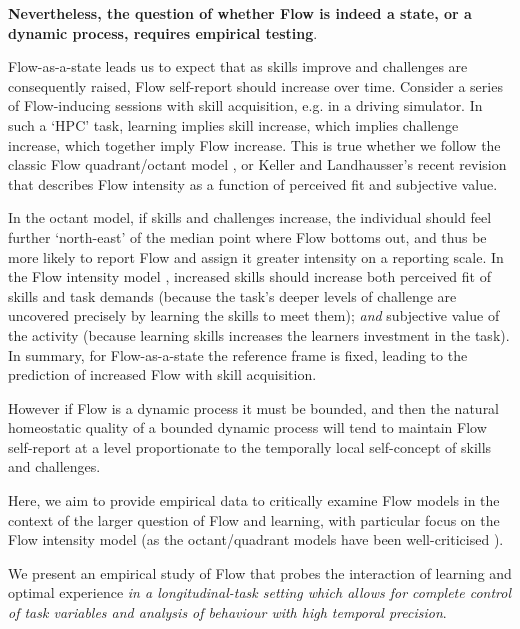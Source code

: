 \documentclass[fleqn,10pt]{wlscirep}
\begin{document}
{\bf Nevertheless, the question of whether Flow is indeed a state, or a dynamic process, requires empirical testing}.

Flow-as-a-state leads us to expect that as skills improve and challenges are consequently raised, Flow self-report should increase over time. Consider a series of Flow-inducing sessions with  skill acquisition, e.g. in a driving simulator. In such a `HPC' task, learning implies skill increase, which implies challenge increase, which together imply Flow increase. This is true whether we follow the classic Flow quadrant/octant model \cite{Massimini1988}, or Keller and Landhausser's \cite[pp-56]{Keller2012} recent revision that describes Flow intensity as a function of perceived fit and subjective value.

In the octant model, if skills and challenges increase, the individual should feel further `north-east' of the median point where Flow bottoms out, and thus be more likely to report Flow and assign it greater intensity on a reporting scale. In the Flow intensity model \cite{Keller2012}, increased skills should increase both perceived fit of skills and task demands (because the task's deeper levels of challenge are uncovered precisely by learning the skills to meet them); {\it and} subjective value of the activity (because learning skills increases the learners investment in the task). In summary, for Flow-as-a-state the reference frame is fixed, leading to the prediction of increased Flow with skill acquisition.

However if Flow is a dynamic process it must be bounded, and then the natural homeostatic quality of a bounded dynamic process will tend to maintain Flow self-report at a level proportionate to the temporally local self-concept of skills and challenges.

Here, we aim to provide empirical data to critically examine Flow models in the context of the larger question of Flow and learning, with particular focus on the Flow intensity model \cite{Keller2012} (as the octant/quadrant models have been well-criticised \cite{Moneta2012}).

We present an empirical study of Flow that probes the interaction of learning and optimal experience {\it in a longitudinal-task setting which allows for complete control of task variables and analysis of behaviour with high temporal precision}.
\end{document}
